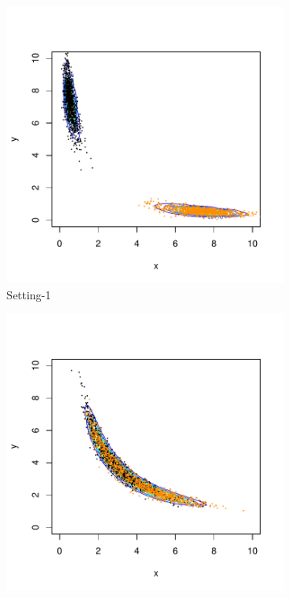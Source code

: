 \documentclass[11pt]{article}
\theoremstyle{remark}
\begin{document}
\begin{figure}[h]
    \centering
    \begin{subfigure}[h]{.45\textwidth}
        \centering
        \includegraphics[width = \textwidth]{plots/boom-2d_density_plot_1_3_8.pdf}
        \caption{Setting-1}
        \label{subfig:boom-2D_1_3_8}
    \end{subfigure}
    \begin{subfigure}[h]{.45\textwidth}
        \centering
        \includegraphics[width = \textwidth]{plots/boom-2d_density_plot_1_10_7.pdf}

\end{subfigure}
\end{figure}
\end{document}
